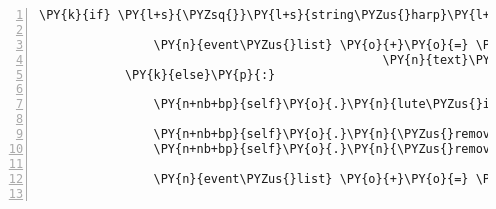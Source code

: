 \begin{Verbatim}[commandchars=\\\{\},numbers=left,firstnumber=1,stepnumber=1]
            \PY{k}{if} \PY{l+s}{\PYZsq{}}\PY{l+s}{string\PYZus{}harp}\PY{l+s}{\PYZsq{}} \PY{o+ow}{not} \PY{o+ow}{in} \PY{n+nb+bp}{self}\PY{o}{.}\PY{n}{host}\PY{o}{.}\PY{n}{rack}\PY{o}{.}\PY{n}{entity\PYZus{}dict}\PY{o}{.}\PY{n}{keys}\PY{p}{(}\PY{p}{)}\PY{p}{:}

                \PY{n}{event\PYZus{}list} \PY{o}{+}\PY{o}{=} \PY{p}{[}\PY{n}{fabula}\PY{o}{.}\PY{n}{SaysEvent}\PY{p}{(}\PY{n}{identifier}\PY{o}{=}\PY{n}{ID\PYZus{}KUNI}\PY{p}{,}
                                                \PY{n}{text}\PY{o}{=}\PY{l+s}{\PYZsq{}}\PY{l+s}{Ich besitze nichts, womit man die kaputte Laute reparieren könnte.}\PY{l+s}{\PYZsq{}}\PY{p}{)}\PY{p}{]}
            \PY{k}{else}\PY{p}{:}

                \PY{n+nb+bp}{self}\PY{o}{.}\PY{n}{lute\PYZus{}is\PYZus{}repaired} \PY{o}{=} \PY{n+nb+bp}{True}

                \PY{n+nb+bp}{self}\PY{o}{.}\PY{n}{\PYZus{}remove\PYZus{}sentence}\PY{p}{(}\PY{n}{ID\PYZus{}CASSANDRA}\PY{p}{,} \PY{l+s}{\PYZsq{}}\PY{l+s}{Ich habe eine Laute. Leider ist sie kaputt.}\PY{l+s}{\PYZsq{}}\PY{p}{)}
                \PY{n+nb+bp}{self}\PY{o}{.}\PY{n}{\PYZus{}remove\PYZus{}sentence}\PY{p}{(}\PY{n}{ID\PYZus{}KUNI}\PY{p}{,} \PY{l+s}{\PYZsq{}}\PY{l+s}{Ich habe eine Saite von einer Harfe.}\PY{l+s}{\PYZsq{}}\PY{p}{)}

                \PY{n}{event\PYZus{}list} \PY{o}{+}\PY{o}{=} \PY{p}{[}\PY{n}{fabula}\PY{o}{.}\PY{n}{PerceptionEvent}\PY{p}{(}\PY{n}{identifier}\PY{o}{=}\PY{n}{ID\PYZus{}CASSANDRA}\PY{p}{,} \PY{n}{perception}\PY{o}{=}\PY{l+s}{\PYZsq{}}\PY{l+s}{Kuni nimmt die kaputte Laute.}\PY{l+s}{\PYZsq{}}\PY{p}{)}\PY{p}{]}


\end{Verbatim}
